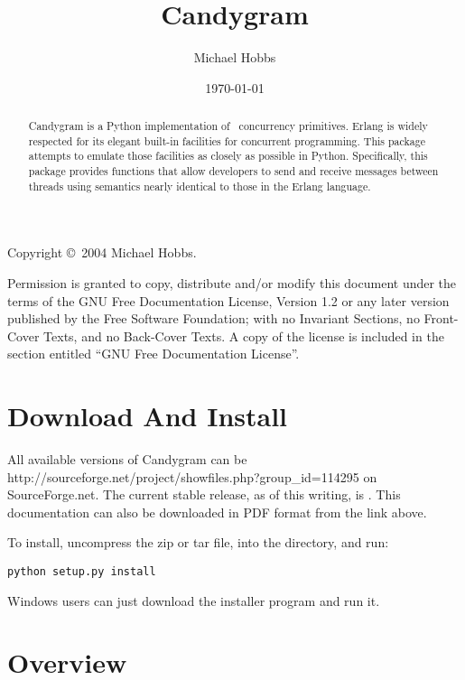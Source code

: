 \documentclass{howto}
\title{Candygram}
\date{\today}
\author{Michael Hobbs}
\newcommand{\Erlang}{\ulink{Erlang}{http://www.erlang.org/}}
\begin{document}
\maketitle

Copyright \copyright\ 2004 Michael Hobbs.

Permission is granted to copy, distribute and/or modify this document
under the terms of the GNU Free Documentation License, Version 1.2
or any later version published by the Free Software Foundation;
with no Invariant Sections, no Front-Cover Texts, and no Back-Cover Texts.
A copy of the license is included in the section entitled ``GNU
Free Documentation License''.

\begin{abstract}
\noindent
Candygram is a Python implementation of \Erlang\ concurrency primitives. Erlang
is widely respected for its elegant built-in facilities for concurrent
programming. This package attempts to emulate those facilities as closely as
possible in Python. Specifically, this package provides functions that allow
developers to send and receive messages between threads using semantics nearly
identical to those in the Erlang language.
\end{abstract}

\tableofcontents



\section{Download And Install}

All available versions of Candygram can be 
	{http://sourceforge.net/project/showfiles.php?group_id=114295} on
SourceForge.net. The current stable release, as of this writing, is \version.
This documentation can also be downloaded in PDF format from the link above.

To install, uncompress the zip or tar file,  into the directory, and
run:
\begin{verbatim}
python setup.py install
\end{verbatim}

Windows users can just download the installer program and run it.



\section{Overview}
\end{document}
